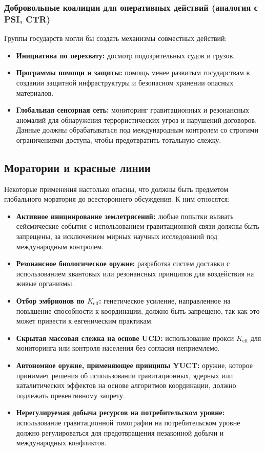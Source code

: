 \documentclass[12pt,a4paper]{article}
\theoremstyle{remark}
\newcommand{\Keff}{K_{\mathrm{eff}}}
\begin{document}
	\subsubsection{Добровольные коалиции для оперативных действий (аналогия с PSI, CTR)}
	
	Группы государств могли бы создать механизмы совместных действий:
	\begin{itemize}
		\item \textbf{Инициатива по перехвату:} досмотр подозрительных судов и грузов.
		\item \textbf{Программы помощи и защиты:} помощь менее развитым государствам в создании защитной инфраструктуры и безопасном хранении опасных материалов.
		\item \textbf{Глобальная сенсорная сеть:} мониторинг гравитационных и резонансных аномалий для обнаружения террористических угроз и нарушений договоров. Данные должны обрабатываться под международным контролем со строгими ограничениями доступа, чтобы предотвратить тотальную слежку.
	\end{itemize}
	
	\subsection{Моратории и красные линии}
	\label{subsec:redlines}
	
	Некоторые применения настолько опасны, что должны быть предметом глобального моратория до всестороннего обсуждения. К ним относятся:
	\begin{itemize}[leftmargin=*]
		\item \textbf{Активное инициирование землетрясений:} любые попытки вызвать сейсмические события с использованием гравитационной связи должны быть запрещены, за исключением мирных научных исследований под международным контролем.
		\item \textbf{Резонансное биологическое оружие:} разработка систем доставки с использованием квантовых или резонансных принципов для воздействия на живые организмы.
		\item \textbf{Отбор эмбрионов по \(\Keff\):} генетическое усиление, направленное на повышение способности к координации, должно быть запрещено, так как это может привести к евгеническим практикам.
		\item \textbf{Скрытая массовая слежка на основе UCD:} использование прокси \(\Keff\) для мониторинга или контроля населения без согласия неприемлемо.
		\item \textbf{Автономное оружие, применяющее принципы YUCT:} оружие, которое принимает решения об использовании гравитационных, ядерных или каталитических эффектов на основе алгоритмов координации, должно подлежать превентивному запрету.
		\item \textbf{Нерегулируемая добыча ресурсов на потребительском уровне:} использование гравитационной томографии на потребительском уровне должно регулироваться для предотвращения незаконной добычи и международных конфликтов.
	\end{itemize}
	
\end{document}
